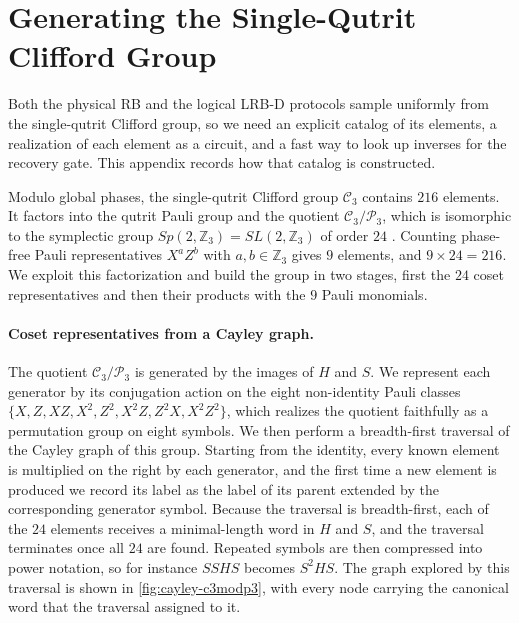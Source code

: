 \section{Generating the Single-Qutrit Clifford Group}
\label{sec:clifford-gen}

Both the physical RB and the logical LRB-D protocols sample uniformly from the single-qutrit Clifford group, so we need an explicit catalog of its elements, a realization of each element as a circuit, and a fast way to look up inverses for the recovery gate. This appendix records how that catalog is constructed.

Modulo global phases, the single-qutrit Clifford group $\mathcal{C}_3$ contains $216$ elements. It factors into the qutrit Pauli group and the quotient $\mathcal{C}_3 / \mathcal{P}_3$, which is isomorphic to the symplectic group $Sp(2,\mathbb{Z}_3) = SL(2,\mathbb{Z}_3)$ of order $24$ \cite{Appleby2005,Hostens2005}. Counting phase-free Pauli representatives $X^a Z^b$ with $a,b \in \mathbb{Z}_3$ gives $9$ elements, and $9 \times 24 = 216$. We exploit this factorization and build the group in two stages, first the $24$ coset representatives and then their products with the $9$ Pauli monomials.

\paragraph{Coset representatives from a Cayley graph.}
The quotient $\mathcal{C}_3/\mathcal{P}_3$ is generated by the images of $H$ and $S$. We represent each generator by its conjugation action on the eight non-identity Pauli classes $\{X, Z, XZ, X^2, Z^2, X^2Z, Z^2X, X^2Z^2\}$, which realizes the quotient faithfully as a permutation group on eight symbols. We then perform a breadth-first traversal of the Cayley graph of this group. Starting from the identity, every known element is multiplied on the right by each generator, and the first time a new element is produced we record its label as the label of its parent extended by the corresponding generator symbol. Because the traversal is breadth-first, each of the $24$ elements receives a minimal-length word in $H$ and $S$, and the traversal terminates once all $24$ are found. Repeated symbols are then compressed into power notation, so for instance $SSHS$ becomes $S^2HS$. The graph explored by this traversal is shown in \autoref{fig:cayley-c3modp3}, with every node carrying the canonical word that the traversal assigned to it.

